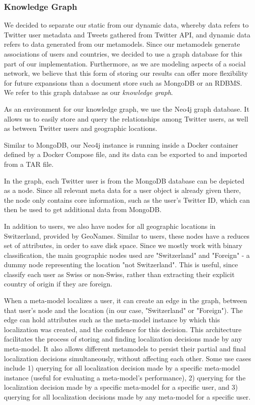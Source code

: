 \documentclass[10pt,a4paper]{article}
\begin{document}
\subsubsection{Knowledge Graph}
We decided to separate our static from our dynamic data, whereby data refers to Twitter user metadata and Tweets gathered from Twitter API, and dynamic data refers to data generated from our metamodels. Since our metamodels generate associations of users and countries, we decided to use a graph database for this part of our implementation. Furthermore, as we are modeling aspects of a social network, we believe that this form of storing our results can offer more flexibility for future expansions than a document store such as MongoDB or an RDBMS. We refer to this graph database as our \textit{knowledge graph}.

As an environment for our knowledge graph, we use the Neo4j graph database. It allows us to easily store and query the relationships among Twitter users, as well as between Twitter users and geographic locations. 

Similar to MongoDB, our Neo4j instance is running inside a Docker container defined by a Docker Compose file, and its data can be exported to and imported from a TAR file.

In the graph, each Twitter user is from the MongoDB database can be depicted as a node. Since all relevant meta data for a user object is already given there, the node only contains core information, such as the user's Twitter ID, which can then be used to get additional data from MongoDB. 

In addition to users, we also have nodes for all geographic locations in Switzerland, provided by GeoNames. Similar to users, these nodes have a reduces set of attributes, in order to save disk space. Since we mostly work with binary classification, the main geographic nodes used are "Switzerland" and "Foreign" - a dummy node representing the location "not Switzerland". This is useful, since classify each user as Swiss or non-Swiss, rather than extracting their explicit country of origin if they are foreign.

When a meta-model localizes a user, it can create an edge in the graph, between that user's node and the location (in our case, "Switzerland" or "Foreign"). The edge can hold attributes such as the meta-model instance by which this localization was created, and the confidence for this decision. This architecture facilitates the process of storing and finding localization decisions made by any meta-model. It also allows different metamodels to persist their partial and final localization decisions simultaneously, without affecting each other. Some use cases include 1) querying for all localization decision made by a specific meta-model instance (useful for evaluating a meta-model's performance), 2) querying for the localization decision made by a specific meta-model for a specific user, and 3) querying for all localization decisions made by any meta-model for a specific user.
\end{document}
